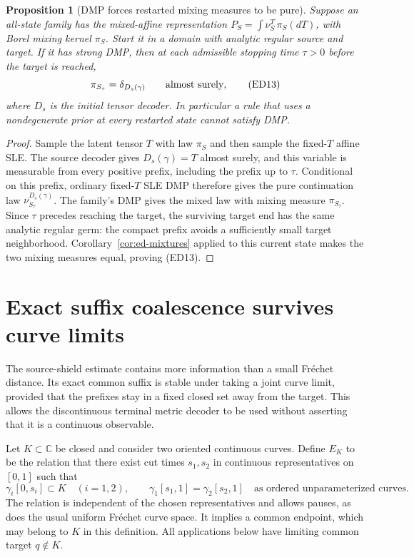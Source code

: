 \documentclass[11pt]{article}
\newtheorem{proposition}[theorem]{Proposition}
\theoremstyle{definition}\newtheorem{definition}[theorem]{Definition}
\theoremstyle{remark}\newtheorem{remark}[theorem]{Remark}
\begin{document}
\begin{proposition}[DMP forces restarted mixing measures to be pure]
\label{prop:ed-posterior}
Suppose an all-state family has the mixed-affine representation
$P_S=\int\nu^T_S\,\pi_S(dT)$, with Borel mixing kernel $\pi_S$.
Start it in a domain with analytic regular source and target. If it has
strong DMP, then at each admissible stopping time $\tau>0$ before the
target is reached,
\[
 \pi_{S_\tau}=\delta_{D_s(\gamma)}\qquad\hbox{almost surely},
 \tag{ED13}
\]
where $D_s$ is the initial tensor decoder. In particular a rule that
uses a nondegenerate prior at every restarted state cannot satisfy DMP.
\end{proposition}
\begin{proof}
Sample the latent tensor $T$ with law $\pi_S$ and then sample the
fixed-$T$ affine SLE. The source decoder gives $D_s(\gamma)=T$ almost
surely, and this variable is measurable from every positive prefix,
including the prefix up to $\tau$. Conditional on this prefix,
ordinary fixed-$T$ SLE DMP therefore gives the pure continuation law
$\nu^{D_s(\gamma)}_{S_\tau}$. The family's DMP gives the mixed law with
mixing measure $\pi_{S_\tau}$. Since $\tau$ precedes reaching the
target, the surviving target end has the same analytic regular germ:
the compact prefix avoids a sufficiently small target neighborhood.
Corollary~\ref{cor:ed-mixtures} applied to this current state makes
the two mixing measures equal, proving (ED13).
\end{proof}


\section{Exact suffix coalescence survives curve limits}
\label{sec:coalescence-bridge}

The source-shield estimate contains more information than a small
Fr\'echet distance. Its exact common suffix is stable under taking a
joint curve limit, provided that the prefixes stay in a fixed closed set
away from the target. This allows the discontinuous terminal metric
decoder to be used without asserting that it is a continuous observable.

Let $K\subset\mathbb C$ be closed and consider two oriented continuous
curves. Define $E_K$ to be the relation
that there exist cut times $s_1,s_2$ in continuous representatives on
$[0,1]$ such that
\[
 \gamma_i[0,s_i]\subset K\quad(i=1,2),\qquad
 \gamma_1[s_1,1]=\gamma_2[s_2,1]
 \quad\text{as ordered unparameterized curves}.
 \tag{CB1}
\]
The relation is independent of the chosen representatives and allows
pauses, as does the usual uniform Fr\'echet curve space. It implies a
common endpoint, which may belong to $K$ in this definition. All
applications below have limiting common target $q\notin K$.
\end{document}
